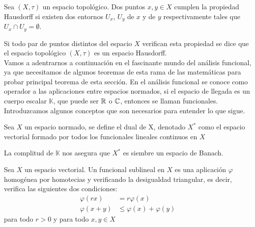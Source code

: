     \begin{definicion}
     Sea $(X,\tau)$ un espacio topológico. Dos puntos $x,y \in X$ cumplen la propiedad Hausdorff si existen dos entornos $U_x$, $U_y$ de $x$ y de $y$ respectivamente tales que $U_x \cap U_y = \emptyset$.  
    \end{definicion}
    
    Si todo par de puntos distintos del espacio $X$ verifican esta propiedad se dice que el espacio topológico $(X,\tau)$ es un espacio Hausdorff.\\  
    
    Vamos a adentrarnos a continuación en el fascinante mundo del análisis funcional, ya que necesitamos de algunos teoremas de esta rama de las matemáticas para probar principal teorema de esta sección. En el análisis funcional se conoce como operador a las aplicaciones entre espacios normados, si el espacio de llegada es un cuerpo escalar $\mathbb{K}$, que puede ser $\mathbb{R}$ o $\mathbb{C}$, entonces se llaman funcionales. Introduzcamos algunos conceptos que son necesarios para entender lo que sigue. \\
    
    
    \begin{definicion}
    Sea $X$ un espacio normado, se define el dual de X, denotado $X^*$ como el espacio vectorial formado por todos los funcionales lineales continuos en $X$
    \end{definicion}
    
    \begin{observacion}
    La complitud de $\mathbb{K}$ nos asegura que $X^*$ es siembre un espacio de Banach.
    \end{observacion}
    
    \begin{definicion}
    Sea $X$ un espacio vectorial. Un funcional sublineal en $X$ es una aplicación $\varphi$ homogénea por homotecias y verificando la desigualdad triangular, es decir, verifica las siguientes dos condiciones:
    \begin{equation}
        \begin{aligned}
            \varphi(rx) & = r \varphi(x)\\
            \varphi(x + y) & \leq \varphi(x) + \varphi(y)
        \end{aligned}
    \end{equation}
    \noindent para todo $r > 0$ y para todo $x,y \in X$
    \end{definicion}

